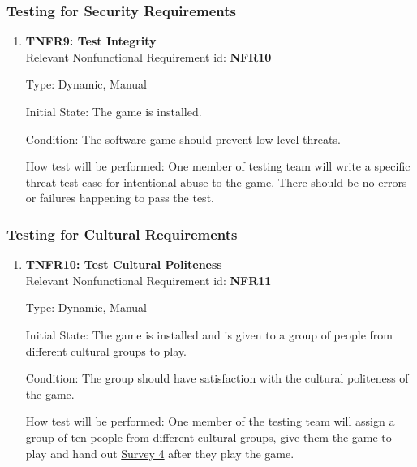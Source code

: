 \documentclass[12pt, titlepage]{article}
\begin{document}
\subsubsection{Testing for Security Requirements}
\begin{enumerate}
\item{\textbf{TNFR9: Test Integrity\\}}
Relevant Nonfunctional Requirement id: \textbf{NFR10}

Type: Dynamic, Manual

Initial State: The game is installed.

Condition: The software game should prevent low level threats.

How test will be performed: One member of testing team will write a specific threat test case for intentional abuse to the game. There should be no errors or failures happening to pass the test.


\end{enumerate}


\subsubsection{Testing for Cultural Requirements}
\begin{enumerate}
\item{\textbf{TNFR10: Test Cultural Politeness\\}}
Relevant Nonfunctional Requirement id: \textbf{NFR11}

Type: Dynamic, Manual

Initial State: The game is installed and is given to a group of people from different cultural groups to play.

Condition: The group should have satisfaction with the cultural politeness of the game.

How test will be performed: One member of the testing team will assign a group of ten people from different cultural groups, give them the game to play and hand out \hyperref[s4]{Survey 4} after they play the game.


\end{enumerate}
\end{document}
